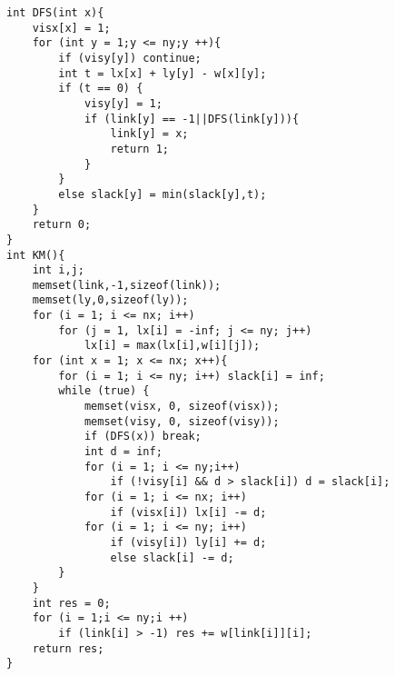 \begin{lstlisting}
int DFS(int x){
    visx[x] = 1;
    for (int y = 1;y <= ny;y ++){
        if (visy[y]) continue;
        int t = lx[x] + ly[y] - w[x][y];
        if (t == 0) {
            visy[y] = 1;
            if (link[y] == -1||DFS(link[y])){
                link[y] = x;
                return 1;
            }
        }
        else slack[y] = min(slack[y],t);
    }
    return 0;
}
int KM(){
    int i,j;
    memset(link,-1,sizeof(link));
    memset(ly,0,sizeof(ly));
    for (i = 1; i <= nx; i++)
        for (j = 1, lx[i] = -inf; j <= ny; j++)
        	lx[i] = max(lx[i],w[i][j]);
    for (int x = 1; x <= nx; x++){
        for (i = 1; i <= ny; i++) slack[i] = inf;
        while (true) {
            memset(visx, 0, sizeof(visx));
            memset(visy, 0, sizeof(visy));
            if (DFS(x)) break;
            int d = inf;
            for (i = 1; i <= ny;i++)
                if (!visy[i] && d > slack[i]) d = slack[i];
            for (i = 1; i <= nx; i++)
                if (visx[i]) lx[i] -= d;
            for (i = 1; i <= ny; i++)
                if (visy[i]) ly[i] += d;
                else slack[i] -= d;
        }
    }
    int res = 0;
    for (i = 1;i <= ny;i ++)
        if (link[i] > -1) res += w[link[i]][i];
    return res;
}
\end{lstlisting}
